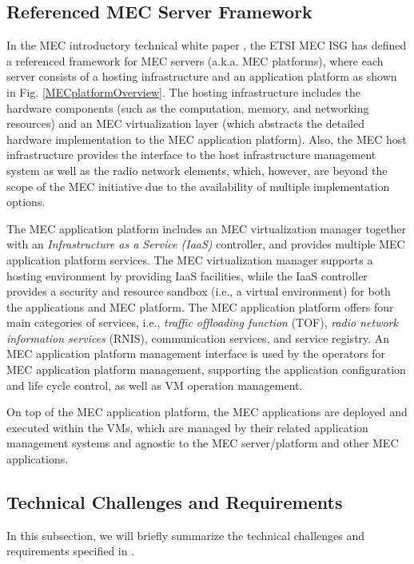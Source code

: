\documentclass[journal]{IEEEtran}
\begin{document}
{\subsection{Referenced MEC Server Framework}



In the MEC introductory technical white paper \cite{ETSI14}, the ETSI MEC ISG has defined a referenced framework for MEC servers (a.k.a. MEC platforms), where each server consists of a hosting infrastructure and an application platform as shown in Fig. \ref{MECplatformOverview}. The hosting infrastructure includes the hardware components (such as the computation, memory, and networking resources) and an MEC virtualization layer (which abstracts the detailed hardware implementation to the MEC application platform). Also, the MEC host infrastructure provides the interface to the host infrastructure management system as well as the radio network elements, which, however, are beyond the scope of the MEC initiative due to the availability of multiple implementation options.


The MEC application platform includes an MEC virtualization manager together with an \emph{Infrastructure as a Service (IaaS)} controller, and provides multiple MEC application platform services. The MEC virtualization manager supports a hosting environment by providing IaaS facilities, while the IaaS controller provides a security and resource sandbox (i.e., a virtual environment) for both the applications and MEC platform. The MEC application platform offers four main categories of services, i.e., \emph{traffic offloading function} (TOF), \emph{radio network information services} (RNIS), communication services, and service registry. An MEC application platform management interface is used by the operators for MEC application platform management, supporting the application configuration and life cycle control, as well as VM operation management.

On top of the MEC application platform, the MEC applications are deployed and executed within the VMs, which are managed by their related application management systems and agnostic to the MEC server/platform and other MEC applications.

\subsection{Technical Challenges and Requirements}

In this subsection, we will briefly summarize the technical challenges and requirements specified in \cite{ETSI14,ETSI_TechRequir}.

}
\end{document}
